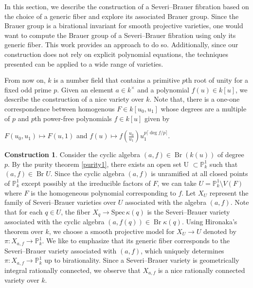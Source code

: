 \documentclass[11pt]{amsart}
\theoremstyle{plain}
\theoremstyle{definition}
\newtheorem{construction}[thm]{Construction}
\renewcommand{\P}{{\mathbb P}}
\DeclareMathOperator{\Br}{Br}
\begin{document}
In this section, we describe the construction of a Severi--Brauer fibration based on the choice of a generic fiber and explore its associated Brauer group. Since the Brauer group is a birational invariant for smooth projective varieties, one would want to compute the Brauer group of a Severi--Brauer fibration using only its generic fiber. This work provides an approach to do so. Additionally, since our construction does not rely on explicit polynomial equations, the techniques presented can be applied to a wide range of varieties.
	
	From now on, \( k \) is a number field that contains a primitive \(p\)th root of unity for a fixed odd prime $p$. Given an element $a \in k^\times$ and a polynomial $f(u) \in k[u]$, we describe the construction of a nice variety over $k$. Note that, there is a one-one correspondence between homogenous \( F \in k[u_0, u_1] \) whose degrees are a multiple of $p$ and $p$th power-free polynomials \( f \in k[u] \) given by
	\begin{center}
		\(
		F(u_0, u_1) \mapsto F(u, 1)
		\)
		and 
		\(
		f(u) \mapsto f\left(\frac{u_0}{u_1}\right) u_1^{p\lceil \deg f / p \rceil}.
		\)
	\end{center}
	
	\begin{construction}\label{construction}
		Consider the cyclic algebra \( (a, f) \in \Br(k(u)) \) of degree $p$. By the purity theorem \ref{purity1}, there exists an open set  U $\subset \mathbb{P}^1_k $ such that \( (a, f) \in \Br U \). Since the cyclic algebra $(a, f)$ is unramified at all closed points of $\P^{1}_{k}$ except possibly at the irreducible factors of $F$, we can take \( U = \mathbb{P}^1_k \setminus V(F) \) where $F$ is the homogeneous polynomial corresponding to $f$. Let \( X_U \) represent the family of Severi--Brauer varieties over \( U \) associated with the algebra \((a, f)\). Note that for each $q \in U$, the fiber $X_q \to \text{Spec}\, \kappa(q)$ is the Severi--Brauer variety associated with the cyclic algebra $(a, f(q)) \in \Br \kappa(q)$. Using Hironaka's theorem over \( k \), we choose a smooth projective model for \( X_U \to U \) denoted by \( \pi: X_{a,f} \to \mathbb{P}^1_k \). We like to emphasize that its generic fiber corresponds to the Severi--Brauer variety associated with \((a, f)\), which uniquely determines \( \pi: X_{a,f} \to \mathbb{P}^1_k \) up to birationality. Since a Severi--Brauer variety is geometrically integral rationally connected, we observe that $X_{a,f}$ is a nice rationally connected variety over $k$.
	\end{construction}
\end{document}
